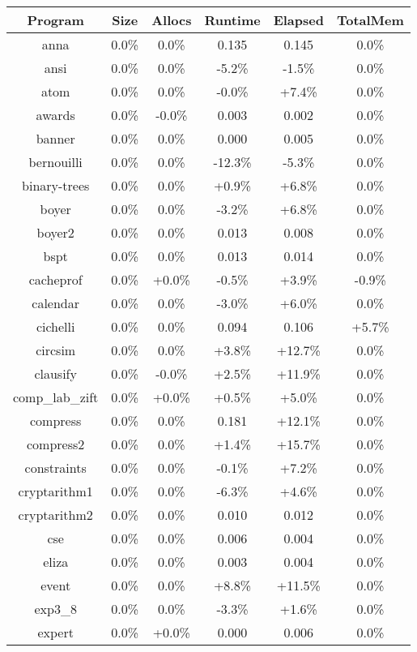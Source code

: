 \begin{tabular}{ c c c c c c }
Program & Size & Allocs & Runtime & Elapsed & TotalMem\\
\hline
anna &  0.0\% &  0.0\% & 0.135 & 0.145 &  0.0\%\\
ansi &  0.0\% &  0.0\% & -5.2\% & -1.5\% &  0.0\%\\
atom &  0.0\% &  0.0\% & -0.0\% & +7.4\% &  0.0\%\\
awards &  0.0\% & -0.0\% & 0.003 & 0.002 &  0.0\%\\
banner &  0.0\% &  0.0\% & 0.000 & 0.005 &  0.0\%\\
bernouilli &  0.0\% &  0.0\% & -12.3\% & -5.3\% &  0.0\%\\
binary-trees &  0.0\% &  0.0\% & +0.9\% & +6.8\% &  0.0\%\\
boyer &  0.0\% &  0.0\% & -3.2\% & +6.8\% &  0.0\%\\
boyer2 &  0.0\% &  0.0\% & 0.013 & 0.008 &  0.0\%\\
bspt &  0.0\% &  0.0\% & 0.013 & 0.014 &  0.0\%\\
cacheprof &  0.0\% & +0.0\% & -0.5\% & +3.9\% & -0.9\%\\
calendar &  0.0\% &  0.0\% & -3.0\% & +6.0\% &  0.0\%\\
cichelli &  0.0\% &  0.0\% & 0.094 & 0.106 & +5.7\%\\
circsim &  0.0\% &  0.0\% & +3.8\% & +12.7\% &  0.0\%\\
clausify &  0.0\% & -0.0\% & +2.5\% & +11.9\% &  0.0\%\\
comp\_lab\_zift &  0.0\% & +0.0\% & +0.5\% & +5.0\% &  0.0\%\\
compress &  0.0\% &  0.0\% & 0.181 & +12.1\% &  0.0\%\\
compress2 &  0.0\% &  0.0\% & +1.4\% & +15.7\% &  0.0\%\\
constraints &  0.0\% &  0.0\% & -0.1\% & +7.2\% &  0.0\%\\
cryptarithm1 &  0.0\% &  0.0\% & -6.3\% & +4.6\% &  0.0\%\\
cryptarithm2 &  0.0\% &  0.0\% & 0.010 & 0.012 &  0.0\%\\
cse &  0.0\% &  0.0\% & 0.006 & 0.004 &  0.0\%\\
eliza &  0.0\% &  0.0\% & 0.003 & 0.004 &  0.0\%\\
event &  0.0\% &  0.0\% & +8.8\% & +11.5\% &  0.0\%\\
exp3\_8 &  0.0\% &  0.0\% & -3.3\% & +1.6\% &  0.0\%\\
expert &  0.0\% & +0.0\% & 0.000 & 0.006 &  0.0\%\\

\end{tabular}
